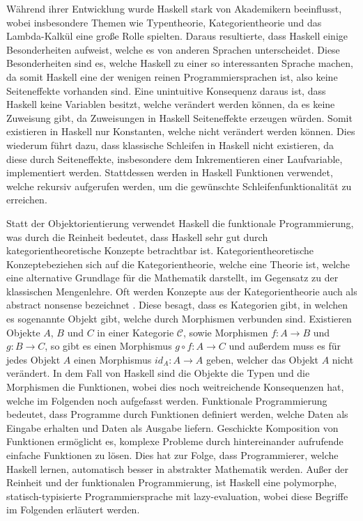 \documentclass{hhuarticle}
\theoremstyle{definition}
\theoremstyle{theorem}
\begin{document}
  Während ihrer Entwicklung wurde Haskell stark von Akademikern beeinflusst,
  wobei insbesondere Themen wie Typentheorie, Kategorientheorie und das Lambda-Kalkül
  eine große Rolle spielten. Daraus resultierte, dass Haskell
  einige Besonderheiten aufweist, welche es von anderen Sprachen unterscheidet.
  Diese Besonderheiten sind es, welche Haskell zu einer so interessanten
  Sprache machen, da somit Haskell eine der wenigen reinen
  Programmiersprachen ist, also keine Seiteneffekte vorhanden sind.
  Eine unintuitive Konsequenz daraus ist, dass Haskell keine Variablen besitzt,
  welche verändert werden können, da es keine Zuweisung gibt,
  da Zuweisungen in Haskell Seiteneffekte erzeugen würden. Somit
  existieren in Haskell nur Konstanten, welche nicht verändert werden können.
  Dies wiederum führt dazu, dass klassische Schleifen in Haskell nicht existieren,
  da diese durch Seiteneffekte, insbesondere dem Inkrementieren einer
  Laufvariable, implementiert werden. Stattdessen werden in Haskell
  Funktionen verwendet, welche rekursiv aufgerufen werden, um
  die gewünschte Schleifenfunktionalität zu erreichen.

  Statt der Objektorientierung verwendet Haskell die funktionale
  Programmierung, was durch die Reinheit bedeutet, dass Haskell
  sehr gut durch kategorientheoretische Konzepte betrachtbar ist.
  \grqq Kategorientheoretische Konzepte\grqq  beziehen sich auf die
  Kategorientheorie, welche eine Theorie ist, welche
  eine alternative Grundlage für die Mathematik darstellt, im Gegensatz
  zu der klassischen Mengenlehre.
  Oft werden Konzepte aus der Kategorientheorie auch als \glqq abstract nonsense \grqq
  bezeichnet \cite{henderson2008generalized}.
  Diese besagt, dass es Kategorien gibt, in welchen es sogenannte Objekt
  gibt, welche durch Morphismen verbunden sind. Existieren
  Objekte $A$, $B$ und $C$ in einer Kategorie $\mathcal{C}$,
  sowie Morphismen $f: A \to B$ und $g: B \to C$, so gibt es einen
  Morphismus $g \circ f: A \to C$ und außerdem muss es für jedes
  Objekt $A$ einen Morphismus $id_A: A \to A$ geben, welcher
  das Objekt $A$ nicht verändert. In dem Fall von Haskell sind die
  Objekte die Typen und die Morphismen die Funktionen, wobei dies noch
  weitreichende Konsequenzen hat, welche im Folgenden noch aufgefasst werden.
  Funktionale Programmierung bedeutet, dass Programme durch Funktionen
  definiert werden, welche Daten als Eingabe erhalten und Daten als
  Ausgabe liefern. Geschickte Komposition von Funktionen ermöglicht
  es, komplexe Probleme durch hintereinander aufrufende einfache
  Funktionen zu lösen.
  Dies hat zur Folge, dass Programmierer, welche Haskell lernen,
  automatisch besser in abstrakter Mathematik werden. Außer der Reinheit
  und der funktionalen Programmierung, ist Haskell eine
  polymorphe, statisch-typisierte Programmiersprache mit
  lazy-evaluation, wobei diese Begriffe im Folgenden erläutert werden.
\end{document}
